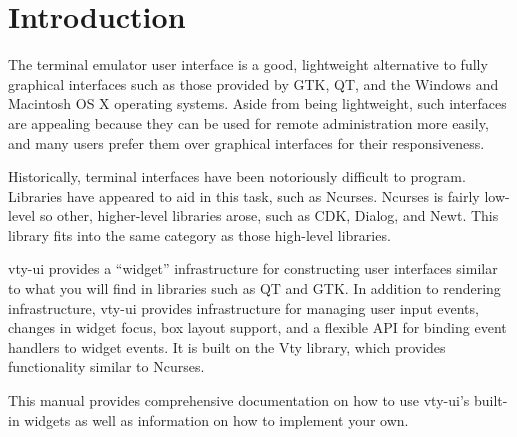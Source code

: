 \section{Introduction}

The terminal emulator user interface is a good, lightweight
alternative to fully graphical interfaces such as those provided by
GTK, QT, and the Windows and Macintosh OS X operating systems.  Aside
from being lightweight, such interfaces are appealing because they can
be used for remote administration more easily, and many users prefer
them over graphical interfaces for their responsiveness.

Historically, terminal interfaces have been notoriously difficult to
program.  Libraries have appeared to aid in this task, such as
Ncurses.  Ncurses is fairly low-level so other, higher-level libraries
arose, such as CDK, Dialog, and Newt.  This library fits into the same
category as those high-level libraries.

vty-ui provides a “widget” infrastructure for constructing user
interfaces similar to what you will find in libraries such as QT and
GTK.  In addition to rendering infrastructure, vty-ui provides
infrastructure for managing user input events, changes in widget focus,
box layout support, and a flexible API for binding event handlers to
widget events.  It is built on the Vty library, which provides
functionality similar to Ncurses.

This manual provides comprehensive documentation on how to use
vty-ui's built-in widgets as well as information on how to implement
your own.
